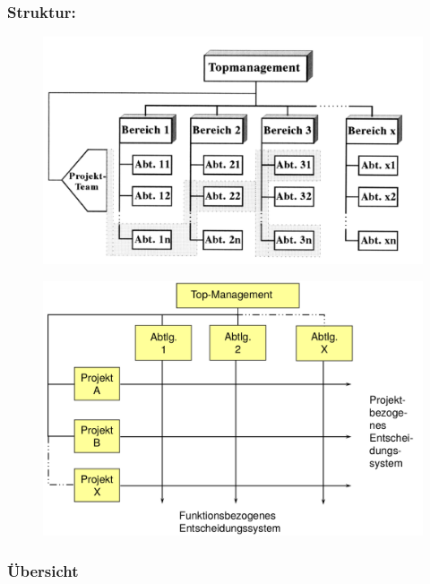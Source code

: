 \documentclass[11pt,a4paper]{article}
\begin{document}
\begin{minipage}[c]{0.45\textwidth}
	\subsubsection*{Struktur:}

	\begin{figure}[H]
	\includegraphics[width=\textwidth]{matrix1}
	\end{figure}
	
	\begin{figure}[H]
	\includegraphics[width=\textwidth]{matrix2}
	\end{figure}
\end{minipage}

\vspace{1cm}

\subsubsection{Übersicht}
\end{document}
